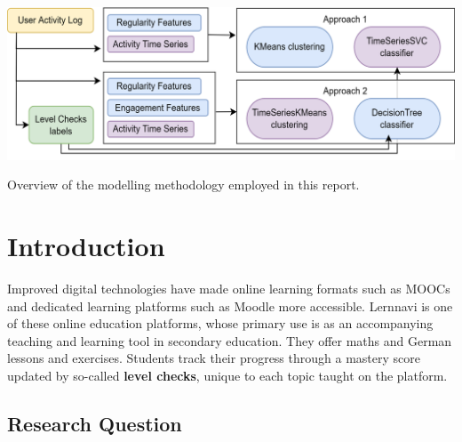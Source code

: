 \documentclass[sigplan,screen]{acmart}
\begin{document}
\begin{teaserfigure}
  \includegraphics[width=\textwidth]{reports/figures/approaches_schema.png}
  \caption{Overview of the modelling methodology employed in this report.}
  \label{fig:teaser}
\end{teaserfigure}

\maketitle

\section{Introduction}\label{sec:intro}
Improved digital technologies have made online learning formats such as MOOCs and dedicated learning platforms such as Moodle more accessible. Lernnavi is one of these online education platforms, whose primary use is as an accompanying teaching and learning tool in secondary education. They offer maths and German lessons and exercises. Students track their progress through a mastery score updated by so-called \textbf{level checks}, unique to each topic taught on the platform. 

\subsection{Research Question}\label{subsec:researchQ}
\end{document}
